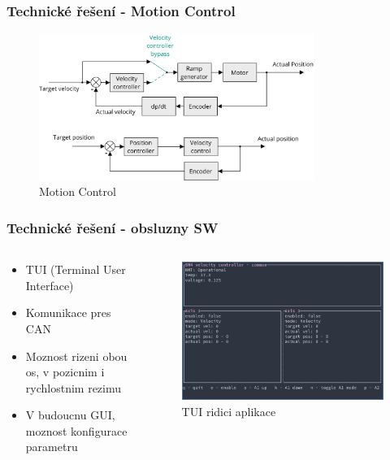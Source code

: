 \documentclass[%
  12pt,       				%
	t,                  %
	aspectratio=1610,   %
	unicode,						%
]{beamer}				    	%
\begin{document}
\begin{frame}
	\frametitle{Technické řešení - Motion Control}
	\begin{figure}%
		\centering
		\includegraphics[width=0.8\textwidth]{../Thesis/obrazky/motion_control}
		\caption{Motion Control}%
		\label{fig:sm4_block}
	\end{figure}
\end{frame}
\begin{frame}
	\frametitle{Technické řešení - obsluzny SW}
	\begin{columns}[T] 								%
		\begin{column}{0.4\textwidth}
			\begin{itemize}
				\item TUI (Terminal User Interface)
				\item Komunikace pres CAN
				\item Moznost rizeni obou os, v pozicnim i rychlostnim rezimu
				\item V budoucnu GUI, moznost konfigurace parametru
			\end{itemize}
		\end{column}
		\begin{column}{0.6\textwidth}		%
			\begin{figure}%
				\centering
				\includegraphics[width=0.8\columnwidth]{../Thesis/obrazky/tui}
				\caption{TUI ridici aplikace}%
				\label{fig:sm4_block}
			\end{figure}
		\end{column}
	\end{columns}
\end{frame}
\end{document}
